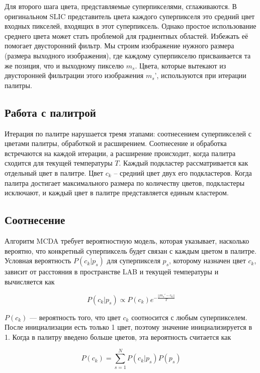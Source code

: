 \documentclass[a4paper,12pt]{report}
\begin{document}
Для второго шага цвета, представляемые суперпикселями, сглаживаются. В оригинальном SLIC представитель цвета каждого суперпикселя это средний цвет входных пикселей, входящих в этот суперпиксель. Однако простое использование среднего цвета может стать проблемой для градиентных областей. Избежать её помогает двусторонний фильтр. Мы строим изображение нужного размера (размера выходного изображения), где каждому суперпикселю присваивается та же позиция, что и выходному пикселю $m_s$. Цвета, которые вытекают из двусторонней фильтрации этого изображения $m_s’$, используются при итерации палитры.

\subsection{Работа с палитрой}

Итерация по палитре нарушается тремя этапами: соотнесением суперпикселей с цветами палитры, обработкой и расширением. Соотнесение и обработка встречаются на каждой итерации, а расширение происходит, когда палитра сходится для текущей температуры $T.$ Каждый подкластер рассматривается как отдельный цвет в палитре. Цвет $c_k$ – средний цвет двух его подкластеров. Когда палитра достигает максимального размера по количеству цветов, подкластеры исключают, и каждый цвет в палитре представляется единым кластером.

\subsection{Соотнесение}

Алгоритм MCDA требует вероятностную модель, которая указывает, насколько вероятно, что конкретный суперпиксель будет связан с каждым цветом в палитре. Условная вероятность $P(c_k|p_s)$ для суперпикселя $p_s$, которому назначен цвет $c_k$, зависит от расстояния в пространстве LAB и текущей температуры и вычисляется как

\begin{equation}
P(c_k|p_s) \propto P(c_k) e^{-\frac{||m_s' - c_k||}{T}}
\label{prob}
\end{equation}

$P(c_k)$ — вероятность того, что цвет $c_k$ соотносится с любым суперпикселем. После инициализации есть только 1 цвет, поэтому значение инициализируется в 1. Когда в палитру введено больше цветов, эта вероятность считается как 

\begin{equation}
P(c_k) = \sum_{s=1}^{N}P(c_k|p_s)P(p_s)
\end{equation}
\end{document}
